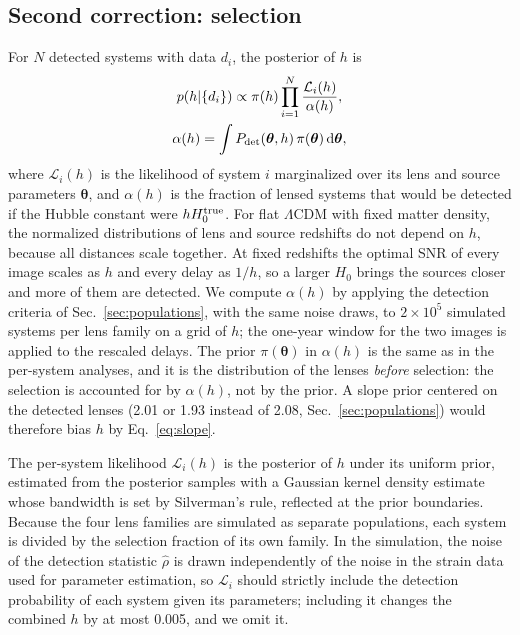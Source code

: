 \subsection{Second correction: selection}
\label{sec:selection}
For $N$ detected systems with data $d_i$, the posterior of $h$ is \citep{loredo2004,mandel2019selection}
\begin{equation}
\begin{gathered}
p(h|\{d_i\})\propto\pi(h)\prod_{i=1}^N\frac{\mathcal L_i(h)}{\alpha(h)},\\
\alpha(h)=\int P_{\rm det}(\boldsymbol\theta,h)\,\pi(\boldsymbol\theta)\,{\rm d}\boldsymbol\theta,
\end{gathered}
\label{eq:joint}
\end{equation}
where $\mathcal L_i(h)$ is the likelihood of system $i$ marginalized over its lens and source parameters $\boldsymbol\theta$, and $\alpha(h)$ is the fraction of lensed systems that would be detected if the Hubble constant were $hH_0^{\rm true}$. For flat $\Lambda$CDM with fixed matter density, the normalized distributions of lens and source redshifts do not depend on $h$, because all distances scale together. At fixed redshifts the optimal SNR of every image scales as $h$ and every delay as $1/h$, so a larger $H_0$ brings the sources closer and more of them are detected. We compute $\alpha(h)$ by applying the detection criteria of Sec.~\ref{sec:populations}, with the same noise draws, to $2\times10^5$ simulated systems per lens family on a grid of $h$; the one-year window for the two images is applied to the rescaled delays. The prior $\pi(\boldsymbol\theta)$ in $\alpha(h)$ is the same as in the per-system analyses, and it is the distribution of the lenses \emph{before} selection: the selection is accounted for by $\alpha(h)$, not by the prior. A slope prior centered on the detected lenses (2.01 or 1.93 instead of 2.08, Sec.~\ref{sec:populations}) would therefore bias $h$ by Eq.~\eqref{eq:slope}.

The per-system likelihood $\mathcal L_i(h)$ is the posterior of $h$ under its uniform prior, estimated from the posterior samples with a Gaussian kernel density estimate whose bandwidth is set by Silverman's rule, reflected at the prior boundaries. Because the four lens families are simulated as separate populations, each system is divided by the selection fraction of its own family. In the simulation, the noise of the detection statistic $\hat\rho$ is drawn independently of the noise in the strain data used for parameter estimation, so $\mathcal L_i$ should strictly include the detection probability of each system given its parameters; including it changes the combined $h$ by at most 0.005, and we omit it.

